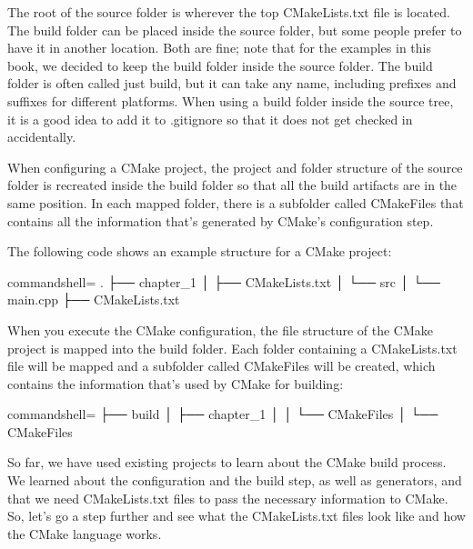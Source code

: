 The root of the source folder is wherever the top CMakeLists.txt file is located. The build folder can be placed inside the source folder, but some people prefer to have it in another location. Both are fine; note that for the examples in this book, we decided to keep the build folder inside the source folder. The build folder is often called just build, but it can take any name, including prefixes and suffixes for different platforms. When using a build folder inside the source tree, it is a good idea to add it to .gitignore so that it does not get checked in accidentally.

When configuring a CMake project, the project and folder structure of the source folder is recreated inside the build folder so that all the build artifacts are in the same position. In each mapped folder, there is a subfolder called CMakeFiles that contains all the information that's generated by CMake's configuration step.

The following code shows an example structure for a CMake project:

\begin{tcblisting}{commandshell={}}
.
├── chapter_1
│      ├── CMakeLists.txt
│      └── src
│            └── main.cpp
├── CMakeLists.txt
\end{tcblisting}

When you execute the CMake configuration, the file  structure of the CMake project is mapped into the build folder. Each folder containing a CMakeLists.txt file will be mapped and a subfolder called CMakeFiles will be created, which contains the information that's used by CMake for building:

\begin{tcblisting}{commandshell={}}
├── build
│     ├── chapter_1
│     │      └── CMakeFiles
│     └── CMakeFiles
\end{tcblisting}

So far, we have used existing projects to learn about the CMake build process. We learned about the configuration and the build step, as well as generators, and that we need CMakeLists.txt files to pass the necessary information to CMake. So, let's go a step further and see what the CMakeLists.txt files look like and how the CMake language works.























